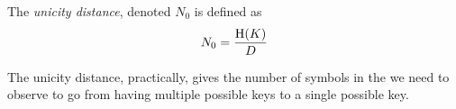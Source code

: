 \begin{definition}\label{def:Unicity_Distance}
  The \emph{unicity distance}, denoted $N_{0}$ is defined as
  \begin{equation}\label{eq:Unicity_Distance}
    N_{0} = \frac{\operatorname{\operatorname{H}}(K)}{D}
  \end{equation}

  The unicity distance, practically, gives the number of symbols in the  we need to observe to go from having multiple possible keys to a single possible key.
\end{definition}
